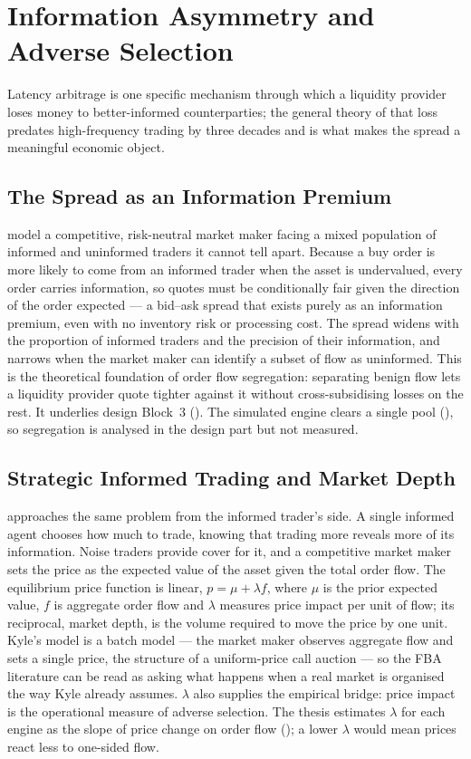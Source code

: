 \section{Information Asymmetry and Adverse Selection}
\label{sec:adverse}

Latency arbitrage is one specific mechanism through which a liquidity
provider loses money to better-informed counterparties; the general
theory of that loss predates high-frequency trading by three decades and
is what makes the spread a meaningful economic object.

\subsection{The Spread as an Information Premium}

\citet{glosten1985bid} model a competitive, risk-neutral market maker
facing a mixed population of informed and uninformed traders it cannot
tell apart. Because a buy order is more likely to come from an informed
trader when the asset is undervalued, every order carries information, so
quotes must be conditionally fair given the direction of the order
expected --- a bid--ask spread that exists purely as an information
premium, even with no inventory risk or processing cost. The spread widens
with the proportion of informed traders and the precision of their
information, and narrows when the market maker can identify a subset of
flow as uninformed. This is the theoretical foundation of order flow
segregation: separating benign flow lets a liquidity provider quote
tighter against it without cross-subsidising losses on the rest. It
underlies design Block~3 (). The simulated engine
clears a single pool (), so segregation is analysed
in the design part but not measured.

\subsection{Strategic Informed Trading and Market Depth}

\citet{kyle1985continuous} approaches the same problem from the informed
trader's side. A single informed agent chooses how much to trade, knowing
that trading more reveals more of its information. Noise traders provide
cover for it, and a competitive market maker sets the price as the
expected value of the asset given the total order flow. The equilibrium price function is linear,
$p = \mu + \lambda f$, where $\mu$ is the prior expected value, $f$ is
aggregate order flow and
$\lambda$ measures price impact per unit of flow; its reciprocal, market
depth, is the volume required to move the price by one unit. Kyle's model
is a batch model --- the market maker observes aggregate flow and sets a
single price, the structure of a uniform-price call auction --- so the FBA
literature can be read as asking what happens when a real market is
organised the way Kyle already assumes. $\lambda$ also supplies the
empirical bridge: price impact is the operational measure of adverse
selection. The thesis estimates $\lambda$ for each engine as the slope of
price change on order flow (); a lower $\lambda$
would mean prices react less to one-sided flow.

